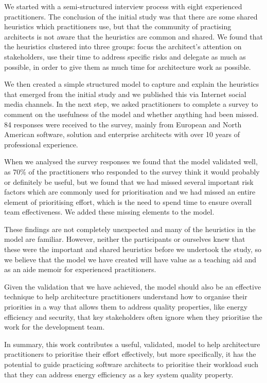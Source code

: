 We started with a semi-structured interview process with eight experienced practitioners.  The conclusion of the initial study was that there are some shared heuristics which practitioners use, but that the community of practising architects is not aware that the heuristics are common and shared.  We found that the heuristics clustered into three groups: focus the architect's attention on stakeholders, use their time to address specific risks and delegate as much as possible, in order to give them as much time for architecture work as possible.

We then created a simple structured model to capture and explain the heuristics that emerged from the initial study and we published this via Internet social media channels.  In the next step, we asked practitioners to complete a survey to comment on the usefulness of the model and whether anything had been missed.  84 responses were received to the survey, mainly from European and North American software, solution and enterprise architects with over 10 years of professional experience.

When we analysed the survey responses we found that the model validated well, as 70\% of the practitioners who responded to the survey think it would probably or definitely be useful, but we found that we had missed several important risk factors which are commonly used for prioritisation and we had missed an entire element of prioritising effort, which is the need to spend time to ensure overall team effectiveness.  We added these missing elements to the model.

These findings are not completely unexpected and many of the heuristics in the model are familiar.  However, neither the participants or ourselves knew that these were the important and shared heuristics before we undertook the study, so we believe that the model we have created will have value as a teaching aid and as an aide memoir for experienced practitioners.

Given the validation that we have achieved, the model should also be an effective technique to help architecture practitioners understand how to organise their priorities in a way that allows them to address quality properties, like energy efficiency and security, that key stakeholders often ignore when they prioritise the work for the development team.

In summary, this work contributes a useful, validated, model to help architecture practitioners to prioritise their effort effectively, but more specifically, it has the potential to guide practicing software architects to prioritise their workload such that they can address energy efficiency as a key system quality property.




